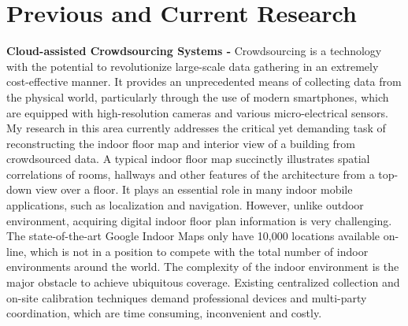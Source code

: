 \documentclass[11pt]{article}
\begin{document}
\section*{Previous and Current Research}

\textbf{Cloud-assisted Crowdsourcing Systems -} Crowdsourcing is a technology with the potential to revolutionize large-scale data gathering in an extremely cost-effective manner. It provides an unprecedented means of collecting data from the physical world, particularly through the use of modern smartphones, which are equipped with high-resolution cameras and various micro-electrical sensors. My research in this area currently addresses the critical yet demanding task of reconstructing the indoor floor map and interior view of a building from crowdsourced data. A typical indoor floor map succinctly illustrates spatial correlations of rooms, hallways and other features of the architecture from a top-down view over a floor. It plays an essential role in many indoor mobile applications, such as localization and navigation. However, unlike outdoor environment, acquiring digital indoor floor plan information is very challenging. The state-of-the-art Google Indoor Maps only have 10,000 locations available on-line, which is not in a position to compete with the total number of indoor environments around the world. The complexity of the indoor environment is the major obstacle to achieve ubiquitous coverage. Existing centralized collection and on-site calibration techniques demand professional devices and multi-party coordination, which are time consuming, inconvenient and costly. 
\end{document}
